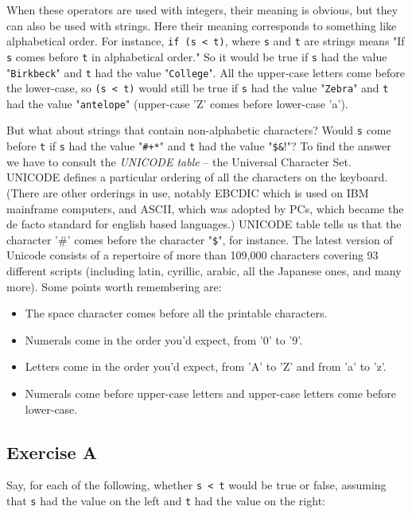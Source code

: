 When these operators are used with integers, their meaning is obvious,
but they can also be used with strings.  Here their meaning corresponds
to something like alphabetical order.  For instance, \verb!if (s < t)!,
where  \verb!s! and \verb!t! are strings means "If  \verb!s! comes before \verb!t!
in alphabetical order."  So it would be true if  \verb!s! had the value
"\verb!Birkbeck!" and \verb!t! had the value "\verb!College!".  All the
upper-case letters come before the lower-case, so \verb!(s < t)! would
still be true if  \verb!s! had the value "\verb!Zebra!" and \verb!t! had the
value "\verb!antelope!" (upper-case 'Z' comes before lower-case 'a').

But what about strings that contain non-alphabetic characters?  Would
\verb!s!  come before \verb!t! if \verb!s! had the value "\verb!#+*!"
and \verb!t! had the value "\verb!$&!!"?  To find the answer we have
to consult the \emph{UNICODE table} -- the Universal Character Set.
UNICODE defines a particular ordering of all the characters on the
keyboard.  (There are other orderings in use, notably EBCDIC which is
used on IBM mainframe computers, and ASCII, which was adopted by PCs,
which became the de facto standard for english based languages.)
UNICODE table tells us that the character '\#' comes before the
character "\verb!$!", for instance.  The latest version of Unicode
consists of a repertoire of more than 109,000 characters covering 93
different scripts (including latin, cyrillic, arabic, all the Japanese
ones, and many more).
%
%
Some points worth remembering are:

\begin{itemize}
\item
The space character comes before all the printable characters.
\item
Numerals come in the order you'd expect, from '0' to '9'.
\item
Letters come in the order you'd expect, from 'A' to 'Z' and from 'a' to 'z'.
\item
Numerals come before upper-case letters and upper-case letters come before lower-case.
\end{itemize}

\subsection*{Exercise A}

Say, for each of the following, whether \verb!s < t! would be
true or false, assuming that  \verb!s! had the value on the left and \verb!t!
had the value on the right:

